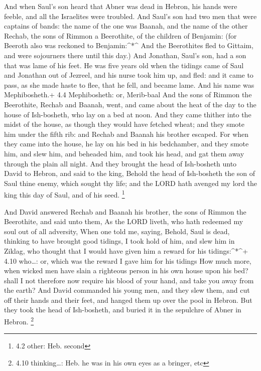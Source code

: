  And when Saul's son heard that Abner was dead in Hebron,
his hands were feeble, and all the Israelites were troubled.
 And Saul's son had two men that were captains of bands: the
name of the one was Baanah, and the name of the other Rechab, the sons
of Rimmon a Beerothite, of the children of Benjamin: (for Beeroth also
was reckoned to Benjamin:\^{}*\^{}  And the Beerothites fled
to Gittaim, and were sojourners there until this day.)  And
Jonathan, Saul's son, had a son that was lame of his feet. He was five
years old when the tidings came of Saul and Jonathan out of Jezreel, and
his nurse took him up, and fled: and it came to pass, as she made haste
to flee, that he fell, and became lame. And his name was Mephibosheth.+
4.4 Mephibosheth: or, Merib-baal  And the sons of Rimmon the
Beerothite, Rechab and Baanah, went, and came about the heat of the day
to the house of Ish-bosheth, who lay on a bed at noon.  And
they came thither into the midst of the house, as though they would have
fetched wheat; and they smote him under the fifth rib: and Rechab and
Baanah his brother escaped.  For when they came into the
house, he lay on his bed in his bedchamber, and they smote him, and slew
him, and beheaded him, and took his head, and gat them away through the
plain all night.  And they brought the head of Ish-bosheth
unto David to Hebron, and said to the king, Behold the head of
Ish-bosheth the son of Saul thine enemy, which sought thy life; and the
LORD hath avenged my lord the king this day of Saul, and of his seed.
\footnote{4.2 other: Heb. second}

 And David answered Rechab and Baanah his brother, the sons
of Rimmon the Beerothite, and said unto them, As the LORD liveth, who
hath redeemed my soul out of all adversity,  When one told
me, saying, Behold, Saul is dead, thinking to have brought good tidings,
I took hold of him, and slew him in Ziklag, who thought that I would
have given him a reward for his tidings:\^{}*\^{}+ 4.10 who\ldots: or,
which was the reward I gave him for his tidings  How much
more, when wicked men have slain a righteous person in his own house
upon his bed? shall I not therefore now require his blood of your hand,
and take you away from the earth?  And David commanded his
young men, and they slew them, and cut off their hands and their feet,
and hanged them up over the pool in Hebron. But they took the head of
Ish-bosheth, and buried it in the sepulchre of Abner in Hebron.
\footnote{4.10 thinking\ldots: Heb. he was in his own eyes as a bringer,
  etc}

